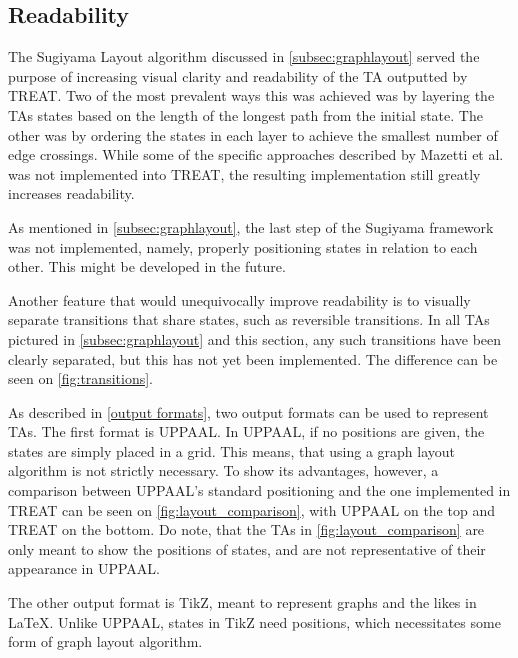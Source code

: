 \subsection{Readability}

The Sugiyama Layout algorithm discussed in \cref{subsec:graphlayout} served the purpose of increasing visual clarity and readability of the TA outputted by TREAT.
Two of the most prevalent ways this was achieved was by layering the TAs states based on the length of the longest path from the initial state. The other was by ordering the states in each layer to achieve the smallest number of edge crossings.
While some of the specific approaches described by Mazetti et al. \cite{Mazetti2012} was not implemented into TREAT, the resulting implementation still greatly increases readability.

As mentioned in \cref{subsec:graphlayout}, the last step of the Sugiyama framework was not implemented, namely, properly positioning states in relation to each other. This might be developed in the future.

Another feature that would unequivocally improve readability is to visually separate transitions that share states, such as reversible transitions.
In all TAs pictured in \cref{subsec:graphlayout} and this section, any such transitions have been clearly separated, but this has not yet been implemented. The difference can be seen on \cref{fig:transitions}.

\begin{center}
    
\end{center}

As described in \cref{output formats}, two output formats can be used to represent TAs.
The first format is UPPAAL. In UPPAAL, if no positions are given, the states are simply placed in a grid. This means, that using a graph layout algorithm is not strictly necessary.
To show its advantages, however, a comparison between UPPAAL's standard positioning and the one implemented in TREAT can be seen on \cref{fig:layout_comparison}, with UPPAAL on the top and TREAT on the bottom.
Do note, that the TAs in \cref{fig:layout_comparison} are only meant to show the positions of states, and are not representative of their appearance in UPPAAL.

\begin{center}
    
    
\end{center}
\vspace{1em}

The other output format is TikZ, meant to represent graphs and the likes in LaTeX. Unlike UPPAAL, states in TikZ need positions, which necessitates some form of graph layout algorithm.


